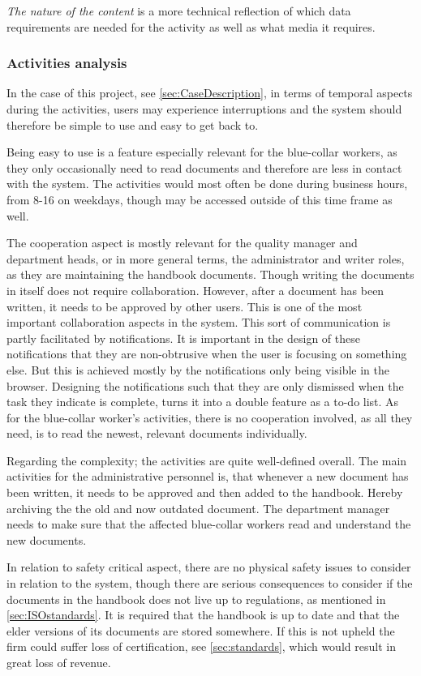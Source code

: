 \textit{The nature of the content} is a more technical reflection of which data requirements are needed for the activity as well as what media it requires.

\subsubsection*{Activities analysis}
In the case of this project, see \cref{sec:CaseDescription}, in terms of temporal aspects during the activities, users may experience interruptions and the system should therefore be simple to use and easy to get back to.

Being easy to use is a feature especially relevant for the blue-collar workers, as they only occasionally need to read documents and therefore are less in contact with the system.
The activities would most often be done during business hours, from 8-16 on weekdays, though may be accessed outside of this time frame as well.

The cooperation aspect is mostly relevant for the  quality manager and department heads, or in more general terms, the administrator and writer roles, as they are maintaining the handbook documents.
Though writing the documents in itself does not require collaboration.
However, after a document has been written, it needs to be approved by other users.
This is one of the most important collaboration aspects in the system.
This sort of communication is partly facilitated by notifications. It is important in the design of these notifications that they are non-obtrusive when the user is focusing on something else. But this is achieved mostly by the notifications only being visible in the browser. Designing the notifications such that they are only dismissed when the task they indicate is complete, turns it into a double feature as a to-do list.
As for the blue-collar worker's activities, there is no cooperation involved, as all they need, is to read the newest, relevant documents individually.

Regarding the complexity; the activities are quite well-defined overall.
The main activities for the administrative personnel is, that whenever a new document has been written, it needs to be approved and then added to the handbook.
Hereby archiving the the old and now outdated document.
The department manager needs to make sure that the affected blue-collar workers read and understand the new documents.

In relation to safety critical aspect, there are no physical safety issues to consider in relation to the system, though there are serious consequences to consider if the documents in the handbook does not live up to regulations, as mentioned in \cref{sec:ISOstandards}.
It is required that the handbook is up to date and that the elder versions of its documents are stored somewhere.
If this is not upheld the firm could suffer loss of certification, see \cref{sec:standards}, which would result in great loss of revenue.

